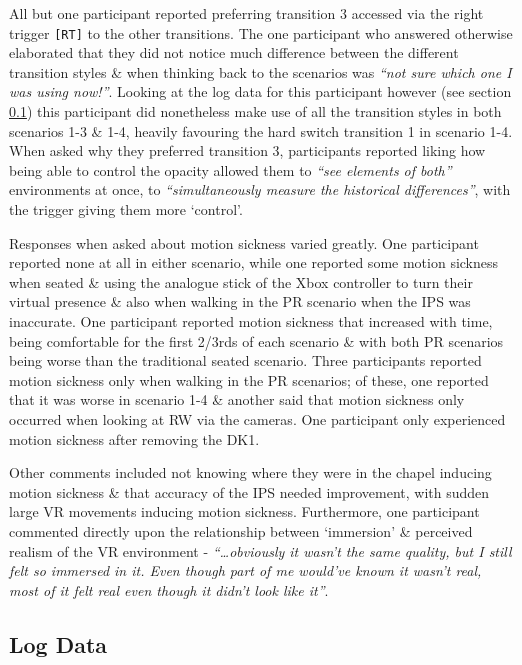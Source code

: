 All but one participant reported preferring transition 3 accessed via the right trigger \texttt{[RT]} to the other transitions. The one participant who answered otherwise elaborated that they did not notice much difference between the different transition styles \& when thinking back to the scenarios was \textit{``not sure which one I was using now!''}. Looking at the log data for this participant however (see section \ref{2-1-log-data}) this participant did nonetheless make use of all the transition styles in both scenarios 1-3 \& 1-4, heavily favouring the hard switch transition 1 in scenario 1-4. When asked why they preferred transition 3, participants reported liking how being able to control the opacity allowed them to \textit{``see elements of both''} environments at once, to \textit{``simultaneously measure the historical differences''}, with the trigger giving them more `control'.

Responses when asked about motion sickness varied greatly. One participant reported none at all in either scenario, while one reported some motion sickness when seated \& using the analogue stick of the Xbox controller to turn their virtual presence \& also when walking in the PR scenario when the IPS was inaccurate. One participant reported motion sickness that increased with time, being comfortable for the first 2/3rds of each scenario \& with both PR scenarios being worse than the traditional seated scenario. Three participants reported motion sickness only when walking in the PR scenarios; of these, one reported that it was worse in scenario 1-4 \& another said that motion sickness only occurred when looking at RW via the cameras. One participant only experienced motion sickness after removing the DK1.

Other comments included not knowing where they were in the chapel inducing motion sickness \& that accuracy of the IPS needed improvement, with sudden large VR movements inducing motion sickness. Furthermore, one participant commented directly upon the relationship between `immersion' \& perceived realism of the VR environment - \textit{``\ldots obviously it wasn't the same quality, but I still felt so immersed in it. Even though part of me would've known it wasn't real, most of it felt real even though it didn't look like it''}.


\subsection{Log Data}
\label{2-1-log-data}

